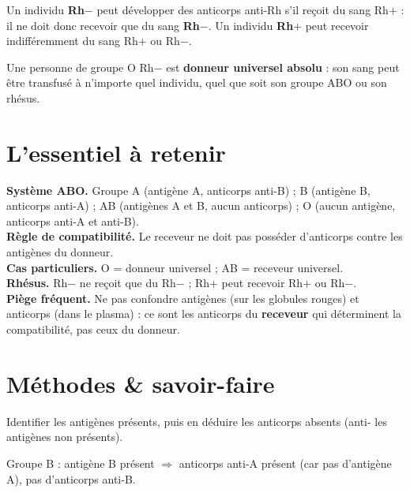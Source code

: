 \begin{propriete}
Un individu \textbf{Rh$-$} peut développer des anticorps anti-Rh s'il reçoit du sang
Rh$+$ : il ne doit donc recevoir que du sang \textbf{Rh$-$}. Un individu \textbf{Rh$+$}
peut recevoir indifféremment du sang Rh$+$ ou Rh$-$.
\end{propriete}

\begin{exemple}
Une personne de groupe O Rh$-$ est \textbf{donneur universel absolu} : son sang peut être
transfusé à n'importe quel individu, quel que soit son groupe ABO ou son rhésus.
\end{exemple}

\section{L'essentiel à retenir}

\begin{synthese}
\textbf{Système ABO.} Groupe A (antigène A, anticorps anti-B) ; B (antigène B, anticorps
anti-A) ; AB (antigènes A et B, aucun anticorps) ; O (aucun antigène, anticorps anti-A et
anti-B).\\[4pt]
\textbf{Règle de compatibilité.} Le receveur ne doit pas posséder d'anticorps contre les
antigènes du donneur.\\[4pt]
\textbf{Cas particuliers.} O = donneur universel ; AB = receveur universel.\\[4pt]
\textbf{Rhésus.} Rh$-$ ne reçoit que du Rh$-$ ; Rh$+$ peut recevoir Rh$+$ ou Rh$-$.\\[4pt]
\textbf{Piège fréquent.} Ne pas confondre antigènes (sur les globules rouges) et
anticorps (dans le plasma) : ce sont les anticorps du \textbf{receveur} qui déterminent
la compatibilité, pas ceux du donneur.
\end{synthese}

\section{Méthodes \& savoir-faire}

Identifier les antigènes présents, puis en déduire les anticorps absents (anti- les
antigènes non présents).
\begin{exemple}
Groupe B : antigène B présent $\Rightarrow$ anticorps anti-A présent (car pas d'antigène
A), pas d'anticorps anti-B.
\end{exemple}

